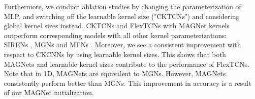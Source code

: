\documentclass{article} \usepackage{iclr2022_conference,times}
\newcommand{\mlp}{{\btt MLP}}
\newcommand{\mlppsi}{\mlp}
\begin{document}
\begin{table}
\begin{minipage}{0.48 \textwidth}
\begin{small}
\end{small}
\end{minipage}\hfill
\begin{minipage}{0.50 \textwidth}
\centering
\caption{Results on CIFAR-10. Results from *original works and  single run.}
\label{tab:cifar-10}
\vspace{-2mm}
\begin{small}
\end{small}
\end{minipage}
\vspace{-8mm}
\end{table}

Furthermore, we conduct ablation studies by changing the parameterization of \mlppsi, and switching off the learnable kernel size ("CKTCNs") and considering global kernel sizes instead. CKTCNs and FlexTCNs with MAGNet kernels outperform corresponding models with all other kernel parameterizations: SIRENs \citep{sitzmann2020implicit}, MGNs and MFNs \citep{fathony2021multiplicative}. Moreover, we see a consistent improvement with respect to CKCNNs \citep{romero2021ckconv} by using learnable kernel sizes. This shows that both MAGNets and learnable kernel sizes contribute to the performance of FlexTCNs.
Note that in 1D, MAGNets are equivalent to MGNs. However, MAGNets consistently perform better than MGNs. This improvement in accuracy is a result of our MAGNet initialization.
\end{document}
